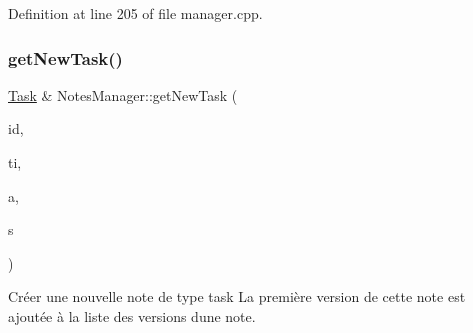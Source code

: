 Definition at line 205 of file manager.\+cpp.

\mbox{\label{class_notes_manager_a39562bf5aef0d7a113317c1421d578fd}} 
\subsubsection{\texorpdfstring{get\+New\+Task()}{getNewTask()}}
{\footnotesize\ttfamily \hyperlink{class_task}{Task} \& Notes\+Manager\+::get\+New\+Task (\begin{DoxyParamCaption}\item[{const Q\+String \&}]{id,  }\item[{const Q\+String \&}]{ti,  }\item[{const Q\+String \&}]{a,  }\item[{E\+N\+U\+M\+::\+Status\+Type}]{s }\end{DoxyParamCaption})}



Créer une nouvelle note de type task La première version de cette note est ajoutée à la liste des versions d\textquotesingle{}une note. 


